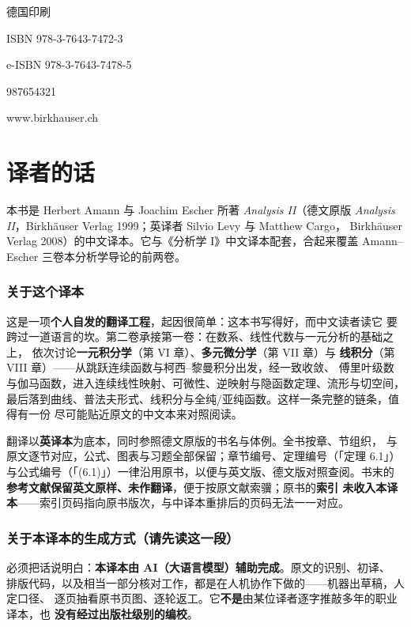 德国印刷

ISBN 978-3-7643-7472-3

e-ISBN 978-3-7643-7478-5

987654321

www.birkhauser.ch

\chapter*{译者的话}

本书是 Herbert Amann 与 Joachim Escher 所著 \textit{Analysis II}（德文原版
\textit{Analysis II}，Birkhäuser Verlag 1999；英译者 Silvio Levy 与 Matthew Cargo，
Birkhäuser Verlag 2008）的中文译本。它与《分析学 I》中文译本配套，合起来覆盖
Amann--Escher 三卷本分析学导论的前两卷。

\subsection*{关于这个译本}

这是一项\textbf{个人自发的翻译工程}，起因很简单：这本书写得好，而中文读者读它
要跨过一道语言的坎。第二卷承接第一卷：在数系、线性代数与一元分析的基础之上，
依次讨论\textbf{一元积分学}（第 VI 章）、\textbf{多元微分学}（第 VII 章）与
\textbf{线积分}（第 VIII 章）——从跳跃连续函数与柯西--黎曼积分出发，经一致收敛、
傅里叶级数与伽马函数，进入连续线性映射、可微性、逆映射与隐函数定理、流形与切空间，
最后落到曲线、普法夫形式、线积分与全纯/亚纯函数。这样一条完整的链条，值得有一份
尽可能贴近原文的中文本来对照阅读。

翻译以\textbf{英译本}为底本，同时参照德文原版的书名与体例。全书按章、节组织，
与原文逐节对应，公式、图表与习题全部保留；章节编号、定理编号（「定理 6.1」）
与公式编号（「(6.1)」）一律沿用原书，以便与英文版、德文版对照查阅。书末的
\textbf{参考文献保留英文原样、未作翻译}，便于按原文献索骥；原书的\textbf{索引
未收入本译本}——索引页码指向原书版次，与中译本重排后的页码无法一一对应。

\subsection*{关于本译本的生成方式（请先读这一段）}

必须把话说明白：\textbf{本译本由 AI（大语言模型）辅助完成}。原文的识别、初译、
排版代码，以及相当一部分核对工作，都是在人机协作下做的——机器出草稿，人定口径、
逐页抽看原书页图、逐轮返工。它\textbf{不是}由某位译者逐字推敲多年的职业译本，也
\textbf{没有经过出版社级别的编校}。

